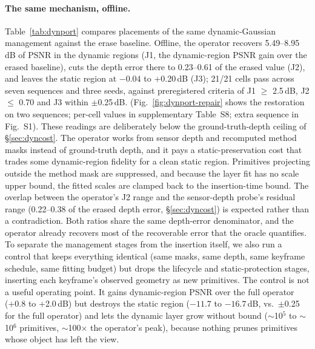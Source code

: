 \documentclass[10pt,twocolumn,letterpaper]{article}
\newcommand{\gate}[1]{{#1}} %
\begin{document}
\paragraph{The same mechanism, offline.}
Table~\ref{tab:dynport} compares placements of the same dynamic-Gaussian management
against the erase baseline. Offline, the operator recovers \gate{5.49--8.95}\,dB of
PSNR in the dynamic regions (J1, the dynamic-region PSNR gain over the erased
baseline), cuts the depth error there to \gate{0.23--0.61} of the
erased value (J2), and leaves the static region at \gate{$-0.04$} to \gate{+0.20}\,dB (J3);
\gate{21/21} cells pass across seven sequences and three seeds, against preregistered
criteria of J1 $\ge$ \gate{2.5}\,dB, J2 $\le$ \gate{0.70} and J3 within
\gate{$\pm$0.25}\,dB. %
(Fig.~\ref{fig:dynport-repair} shows the restoration on two sequences; per-cell values in
supplementary Table~S8; extra sequence in Fig.~S1).
These readings are deliberately below the ground-truth-depth ceiling of \S\ref{sec:dyncost}. The operator works
from sensor depth and recomputed method masks instead of
ground-truth depth, and it pays a static-preservation cost that trades some dynamic-region fidelity
for a clean static region. Primitives projecting outside the method mask are suppressed, and because
the layer fit has no scale upper bound, the
fitted scales are clamped back to the insertion-time bound. The overlap between the operator's J2
range and the sensor-depth probe's residual range (\gate{0.22--0.38} of the erased depth error,
\S\ref{sec:dyncost})
is expected rather than a contradiction. Both ratios share the same depth-error denominator, and the
operator already recovers most of the recoverable error that
the oracle quantifies. To separate the management stages from the insertion itself, we also run a
control that keeps everything identical (same masks, same depth, same keyframe
schedule, same fitting budget) but drops the lifecycle and static-protection stages,
inserting each keyframe's observed geometry as new primitives. The control is not a useful operating
point. It gains dynamic-region PSNR over the full operator
(\gate{+0.8} to \gate{+2.0}\,dB) but destroys the static region
(\gate{$-11.7$} to \gate{$-16.7$}\,dB, vs.\ \gate{$\pm$0.25} for the full operator)
and lets the dynamic layer grow without bound (\gate{$\sim$10$^5$} to \gate{$\sim$10$^6$}
primitives, \gate{$\sim$100$\times$} the operator's peak), because nothing prunes
primitives whose object has left the view. %
\end{document}
